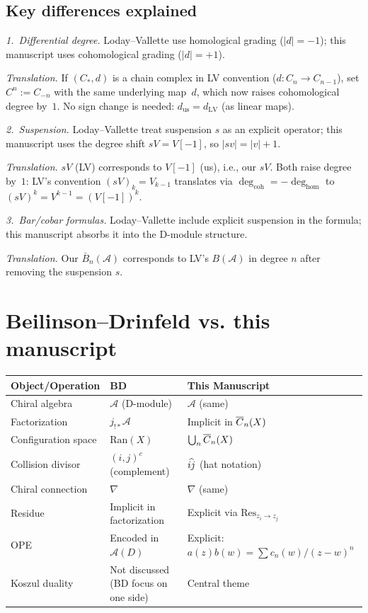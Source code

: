 \subsection{Key differences explained}

\emph{1.~Differential degree.}
Loday--Vallette use homological grading ($|d| = -1$); this manuscript uses cohomological grading ($|d| = +1$).

\emph{Translation.} If $(C_*, d)$ is a chain complex in LV convention ($d: C_n \to C_{n-1}$), set $C^n := C_{-n}$ with the same underlying map~$d$, which now raises cohomological degree by~$1$.  No sign change is needed: $d_{\text{us}} = d_{\text{LV}}$ (as linear maps).

\emph{2.~Suspension.}
Loday--Vallette treat suspension $s$ as an explicit operator; this manuscript uses the degree shift $sV = V[-1]$, so $|sv| = |v| + 1$.

\emph{Translation.} $sV$ (LV) corresponds to $V[-1]$ (us), i.e., our $sV$.  Both raise degree by~$1$: LV's convention $(sV)_k = V_{k-1}$ translates via $\deg_{\mathrm{coh}} = -\deg_{\mathrm{hom}}$ to $(sV)^k = V^{k-1} = (V[-1])^k$.

\emph{3.~Bar/cobar formulas.}
Loday--Vallette include explicit suspension in the formula; this manuscript absorbs it into the D-module structure.

\emph{Translation.} Our $\bar{B}_n(\mathcal{A})$ corresponds to LV's $B(\mathcal{A})$ in degree $n$ after removing the suspension $s$.

\section{Beilinson--Drinfeld vs. this manuscript}

\begin{center}
\begin{tabular}{|>{\raggedright\arraybackslash}p{5.8cm}|>{\raggedright\arraybackslash}p{3.9cm}|>{\raggedright\arraybackslash}p{3.9cm}|}
\hline
\textbf{Object/Operation} & \textbf{BD \cite{BD04}} & \textbf{This Manuscript} \\
\hline
Chiral algebra & $\mathcal{A}$ (D-module) & $\mathcal{A}$ (same) \\
Factorization & $j_{!*}\mathcal{A}$ & Implicit in $\overline{C}_{n}(X)$ \\
Configuration space & $\text{Ran}(X)$ & $\bigcup_n \overline{C}_{n}(X)$ \\
Collision divisor & $(i,j)^c$ (complement) & $\widehat{ij}$ (hat notation) \\
Chiral connection & $\nabla$ & $\nabla$ (same) \\
Residue & Implicit in factorization & Explicit via $\text{Res}_{z_i \to z_j}$ \\
OPE & Encoded in $\mathcal{A}(D)$ & Explicit: $a(z)b(w) = \sum c_n(w)/(z-w)^n$ \\
Koszul duality & Not discussed (BD focus on one side) & Central theme \\
\hline
\end{tabular}
\end{center}

